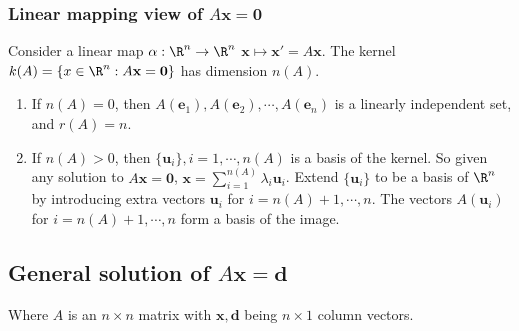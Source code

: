 \documentclass[a4paper]{article}
\begin{document}
\subsubsection{Linear mapping view of \texorpdfstring{$A\mathbf{x} = \mathbf{0}$}{Ax = 0}}
Consider a linear map $\alpha: \R^n \to \R^n$ $\mathbf{x} \mapsto \mathbf{x}' = A\mathbf{x}$. The kernel $k(A) = \{x\in \R^n: A\mathbf{x} = \mathbf{0}\}$ has dimension $n(A)$.

\begin{enumerate}
  \item If $n(A) = 0$, then $A(\mathbf{e}_1), A(\mathbf{e}_2), \cdots, A(\mathbf{e}_n)$ is a linearly independent set, and $r(A) = n$.
  \item If $n(A) > 0$, then $\{\mathbf{u}_i\}, i = 1, \cdots, n(A)$ is a basis of the kernel. So given any solution to $A\mathbf{x} = \mathbf{0}$, $\displaystyle \mathbf{x} = \sum_{i = 1}^{n(A)} \lambda_i \mathbf{u}_i$. Extend $\{\mathbf{u}_i\}$ to be a basis of $\R^n$ by introducing extra vectors $\mathbf{u}_{i}$ for $i = n(A) + 1, \cdots, n$. The vectors $A(\mathbf{u}_i)$ for $i = n(A) + 1, \cdots, n$ form a basis of the image.
\end{enumerate}

\subsection{General solution of \texorpdfstring{$A\mathbf{x} = \mathbf{d}$}{Ax = d}}
Where $A$ is an $n\times n$ matrix with $\mathbf{x, d}$ being $n \times 1$ column vectors.
\end{document}
